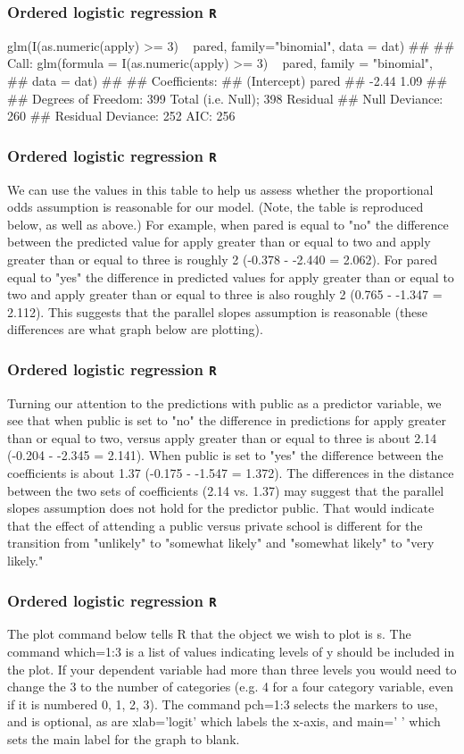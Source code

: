 \documentclass[00-GLMregslides.tex]{subfiles}
\begin{document}
\begin{frame}[fragile]
	\frametitle{Ordered logistic regression \texttt{R} }
	\Large
	
glm(I(as.numeric(apply) >= 3) ~ pared, family="binomial", data = dat)
## 
## Call:  glm(formula = I(as.numeric(apply) >= 3) ~ pared, family = "binomial", 
##     data = dat)
## 
## Coefficients:
## (Intercept)        pared  
##       -2.44         1.09  
## 
## Degrees of Freedom: 399 Total (i.e. Null);  398 Residual
## Null Deviance:	    260 
## Residual Deviance: 252 	AIC: 256
\end{frame}
\begin{frame}[fragile]
	\frametitle{Ordered logistic regression \texttt{R} }
	\Large
	We can use the values in this table to help us assess whether the proportional odds assumption is reasonable for our model. (Note, the table is reproduced below, as well as above.) For example, when pared is equal to "no" the difference between the predicted value for apply greater than or equal to two and apply greater than or equal to three is roughly 2 (-0.378 - -2.440 = 2.062). For pared equal to "yes" the difference in predicted values for apply greater than or equal to two and apply greater than or equal to three is also roughly 2 (0.765 - -1.347 = 2.112). This suggests that the parallel slopes assumption is reasonable (these differences are what graph below are plotting). 

\end{frame}
\begin{frame}[fragile]
	\frametitle{Ordered logistic regression \texttt{R} }
	\Large
	Turning our attention to the predictions with public as a predictor variable, we see that when public is set to "no" the difference in predictions for apply greater than or equal to two, versus apply greater than or equal to three is about 2.14 (-0.204 - -2.345 = 2.141). When public is set to "yes" the difference between the coefficients is about 1.37 (-0.175 - -1.547 = 1.372). The differences in the distance between the two sets of coefficients (2.14 vs. 1.37) may suggest that the parallel slopes assumption does not hold for the predictor public. That would indicate that the effect of attending a public versus private school is different for the transition from "unlikely" to "somewhat likely" and "somewhat likely" to "very likely."
\end{frame}
\begin{frame}[fragile]
	\frametitle{Ordered logistic regression \texttt{R} }
	\Large
The plot command below tells R that the object we wish to plot is s. The command which=1:3 is a list of values indicating levels of y should be included in the plot. If your dependent variable had more than three levels you would need to change the 3 to the number of categories (e.g. 4 for a four category variable, even if it is numbered 0, 1, 2, 3). The command pch=1:3 selects the markers to use, and is optional, as are xlab='logit' which labels the x-axis, and main=' ' which sets the main label for the graph to blank. 
\end{frame}
\end{document}
